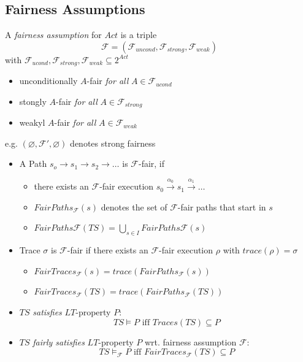 \documentclass[a4paper, 10pt]{article}
\begin{document}
\subsection*{Fairness Assumptions}
\begin{shaded}
    A \emph{fairness assumption} for $Act$ is a triple \[ \mathcal{F}=(\mathcal{F}_{uncond},\mathcal{F}_{strong},\mathcal{F}_{weak}) \] with $\mathcal{F}_{ucond},\mathcal{F}_{strong},\mathcal{F}_{weak}\subseteq 2^{Act}$
    \begin{itemize}
        \item unconditionally $A$-fair \emph{for all} $A\in\mathcal{F}_{ucond}$
        \item stongly $A$-fair \emph{for all} $A\in\mathcal{F}_{strong}$
        \item weakyl $A$-fair \emph{for all} $A\in\mathcal{F}_{weak}$
    \end{itemize}
    e.g. $(\varnothing,\mathcal{F}',\varnothing)$ denotes strong fairness
\end{shaded}
\begin{itemize}
    \item A Path $s_o\to s_1\to s_2\to\dots$ is $\mathcal{F}$-fair, if
    \begin{itemize}
        \item there exists an $\mathcal{F}$-fair execution $s_0\overset{\alpha_0}{\longrightarrow}s_1\overset{\alpha_1}{\longrightarrow}\dots$
        \item $FairPaths_\mathcal{F}(s)$ denotes the set of $\mathcal{F}$-fair paths that start in $s$
        \item $FairPaths\mathcal{F}(TS)=\bigcup_{s\in I} FairPaths\mathcal{F}(s)$
    \end{itemize}
    \item Trace $\sigma$ is $\mathcal{F}$-fair if there exists an $\mathcal{F}$-fair execution $\rho$ with $trace(\rho)=\sigma$
    \begin{itemize}
        \item $FairTraces_\mathcal{F}(s)=trace(FairPaths_\mathcal{F}(s))$
        \item $FairTraces_\mathcal{F}(TS)=trace(FairPaths_\mathcal{F}(TS))$
    \end{itemize}
    \item $TS$ \emph{satisfies} $LT$-property $P$: \[ TS\models P \textrm{ iff } Traces(TS)\subseteq P \]
    \item $TS$ \emph{fairly satisfies} $LT$-property $P$ wrt. fairness assumption $\mathcal{F}$: \[ TS\models_\mathcal{F} P \textrm{ iff } FairTraces_\mathcal{F}(TS)\subseteq P \]
\end{itemize}
\end{document}
